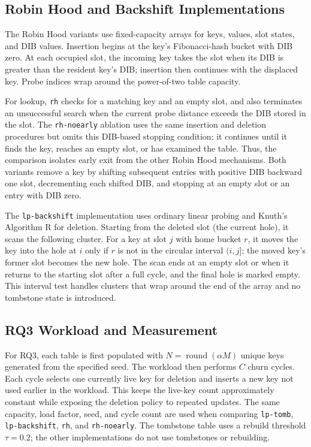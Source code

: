 \documentclass[conference]{IEEEtran}
\begin{document}
\subsection{Robin Hood and Backshift Implementations}
The Robin Hood variants use fixed-capacity arrays for keys, values, slot
states, and DIB values. Insertion begins at the key's Fibonacci-hash bucket
with DIB zero. At each occupied slot, the incoming key takes the slot when its
DIB is greater than the resident key's DIB; insertion then continues with the
displaced key. Probe indices wrap around the power-of-two table capacity.

For lookup, \texttt{rh} checks for a matching key and an empty slot, and also
terminates an unsuccessful search when the current probe distance exceeds the
DIB stored in the slot. The \texttt{rh-noearly} ablation uses the same
insertion and deletion procedures but omits this DIB-based stopping condition;
it continues until it finds the key, reaches an empty slot, or has examined
the table. Thus, the comparison isolates early exit from the other Robin Hood
mechanisms. Both variants remove a key by shifting subsequent entries with
positive DIB backward one slot, decrementing each shifted DIB, and stopping
at an empty slot or an entry with DIB zero.

The \texttt{lp-backshift} implementation uses ordinary linear probing and
Knuth's Algorithm R for deletion. Starting from the deleted slot (the current
hole), it scans the following cluster. For a key at slot $j$ with home bucket
$r$, it moves the key into the hole at $i$ only if $r$ is not in the circular
interval $(i,j]$; the moved key's former slot becomes the new hole. The scan
ends at an empty slot or when it returns to the starting slot after a full
cycle, and the final hole is marked empty. This interval test handles clusters
that wrap around the end of the array and no tombstone state is introduced.

\subsection{RQ3 Workload and Measurement}
For RQ3, each table is first populated with
$N=\operatorname{round}(\alpha M)$ unique keys generated from the specified
seed. The workload then performs $C$ churn cycles. Each cycle selects one
currently live key for deletion and inserts a new key not used earlier in the
workload. This keeps the live-key count approximately constant while exposing
the deletion policy to repeated updates. The same capacity, load factor,
seed, and cycle count are used when comparing \texttt{lp-tomb},
\texttt{lp-backshift}, \texttt{rh}, and \texttt{rh-noearly}. The tombstone
table uses a rebuild threshold $\tau=0.2$; the other implementations do not
use tombstones or rebuilding.
\end{document}
